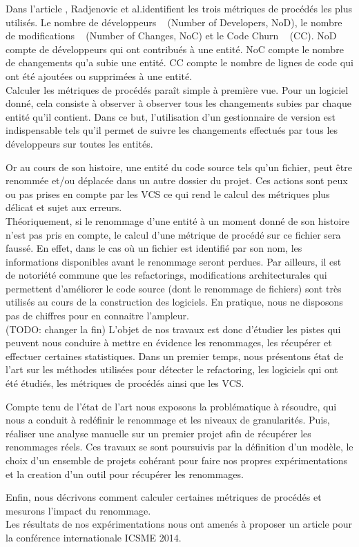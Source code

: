 Dans l'article \cite{radjenovic_software_2013}, Radjenovic et al.identifient les trois métriques de procédés les plus utilisés. Le nombre de développeurs ~\cite{weyuker_too_2008} (Number of Developers, NoD), le nombre de modifications ~\cite{graves_predicting_2000} (Number of Changes, NoC) et le Code Churn ~\cite{munson_code_1998} (CC). NoD compte de développeurs qui ont contribués à une entité. NoC compte le nombre de changements qu'a subie une entité. CC compte le nombre de lignes de code qui ont été ajoutées ou supprimées à une entité.\\
 

Calculer les métriques de procédés paraît simple à première vue. Pour un logiciel donné, cela consiste à observer à observer tous les changements subies par chaque entité qu'il contient. Dans ce but, l'utilisation d'un gestionnaire de version est indispensable tels qu'il permet de suivre les changements effectués par tous les développeurs sur toutes les entités. 

Or au cours de son histoire, une entité du code source tels qu'un fichier, peut être renommée et/ou déplacée dans un autre dossier du projet. Ces actions sont peux ou pas prises en compte par les VCS ce qui rend le calcul des métriques plus délicat et sujet aux erreurs.\\

Théoriquement, si le renommage d'une entité à un moment donné de son histoire n'est pas pris en compte, le calcul d'une métrique de procédé sur ce fichier sera faussé. En effet, dans le cas où un fichier est identifié par son nom, les informations disponibles avant le renommage seront perdues. Par ailleurs, il est de notoriété commune que les refactorings, modifications architecturales qui permettent d'améliorer le code source (dont le renommage de fichiers) sont très utilisés au cours de la construction des logiciels. En pratique, nous ne disposons pas de chiffres pour en connaitre l'ampleur.\\

(TODO: changer la fin)
L’objet de nos travaux est donc d’étudier les pistes qui peuvent nous conduire à mettre en évidence les renommages, les récupérer et effectuer certaines statistiques.
Dans un premier temps, nous présentons état de l'art sur les méthodes utilisées pour détecter le refactoring, les logiciels qui ont été étudiés, les métriques de procédés ainsi que les VCS. 

Compte tenu de l'état de l'art nous exposons la problématique à résoudre, qui nous a conduit à redéfinir le renommage et les niveaux de granularités. Puis, réaliser une analyse manuelle sur un premier projet afin de récupérer les renommages réels. Ces travaux se sont poursuivis par la définition d'un modèle, le choix d'un ensemble de projets cohérant pour faire nos propres expérimentations et la creation d'un outil pour récupérer les renommages.

 Enfin, nous décrivons comment calculer certaines métriques de procédés et mesurons l'impact du renommage.\\
 Les résultats de nos expérimentations nous ont amenés à proposer un article pour la conférence internationale ICSME 2014.\\


